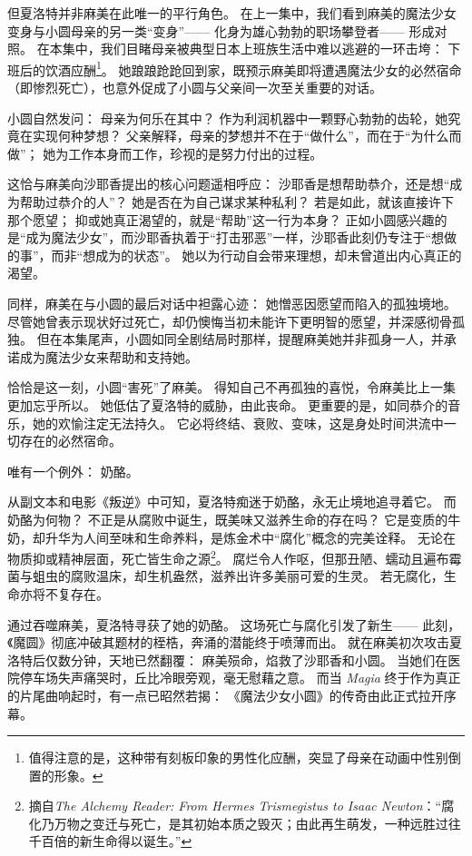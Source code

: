 但夏洛特并非麻美在此唯一的平行角色。
在上一集中，我们看到麻美的魔法少女变身与小圆母亲的另一类“变身”——
化身为雄心勃勃的职场攀登者——
形成对照。
在本集中，我们目睹母亲被典型日本上班族生活中难以逃避的一环击垮：
下班后的饮酒应酬\footnote{%
    值得注意的是，这种带有刻板印象的男性化应酬，突显了母亲在动画中性别倒置的形象。
}\cite{ref27}。
她踉踉跄跄回到家，既预示麻美即将遭遇魔法少女的必然宿命（即惨烈死亡），也意外促成了小圆与父亲间一次至关重要的对话。

小圆自然发问：
母亲为何乐在其中？
作为利润机器中一颗野心勃勃的齿轮，她究竟在实现何种梦想？
父亲解释，母亲的梦想并不在于“做什么”，而在于“为什么而做”；
她为工作本身而工作，珍视的是努力付出的过程。

这恰与麻美向沙耶香提出的核心问题遥相呼应：
沙耶香是想帮助恭介，还是想“成为帮助过恭介的人”？
她是否在为自己谋求某种私利？
若是如此，就该直接许下那个愿望；
抑或她真正渴望的，就是“帮助”这一行为本身？
正如小圆感兴趣的是“成为魔法少女”，而沙耶香执着于“打击邪恶”一样，沙耶香此刻仍专注于“想做的事”，而非“想成为的状态”。
她以为行动自会带来理想，却未曾道出内心真正的渴望。

同样，麻美在与小圆的最后对话中袒露心迹：
她憎恶因愿望而陷入的孤独境地。
尽管她曾表示现状好过死亡，却仍懊悔当初未能许下更明智的愿望，并深感彻骨孤独。
但在本集尾声，小圆如同全剧结局时那样，提醒麻美她并非孤身一人，并承诺成为魔法少女来帮助和支持她。

恰恰是这一刻，小圆“害死”了麻美。
得知自己不再孤独的喜悦，令麻美比上一集更加忘乎所以。
她低估了夏洛特的威胁，由此丧命。
更重要的是，如同恭介的音乐，她的欢愉注定无法持久。
它必将终结、衰败、变味，这是身处时间洪流中一切存在的必然宿命。

唯有一个例外：
奶酪。

从副文本和电影《叛逆》中可知，夏洛特痴迷于奶酪，永无止境地追寻着它。
而奶酪为何物？
不正是从腐败中诞生，既美味又滋养生命的存在吗？
它是变质的牛奶，却升华为人间至味和生命养料，是炼金术中“腐化”概念的完美诠释。
无论在物质抑或精神层面，死亡皆生命之源\footnote{%
    摘自\emph{The Alchemy Reader: From Hermes Trismegistus to Isaac Newton}：“腐化乃万物之变迁与死亡，是其初始本质之毁灭；由此再生萌发，一种远胜过往千百倍的新生命得以诞生。”
}\cite{ref28}。
腐烂令人作呕，但那丑陋、蠕动且遍布霉菌与蛆虫的腐败温床，却生机盎然，滋养出许多美丽可爱的生灵。
若无腐化，生命亦将不复存在。

通过吞噬麻美，夏洛特寻获了她的奶酪。
这场死亡与腐化引发了新生——
此刻，《魔圆》彻底冲破其题材的桎梏，奔涌的潜能终于喷薄而出。
就在麻美初次攻击夏洛特后仅数分钟，天地已然翻覆：
麻美殒命，焰救了沙耶香和小圆。
当她们在医院停车场失声痛哭时，丘比冷眼旁观，毫无慰藉之意。
而当 \emph{Magia} 终于作为真正的片尾曲响起时，有一点已昭然若揭：
《魔法少女小圆》的传奇由此正式拉开序幕。
